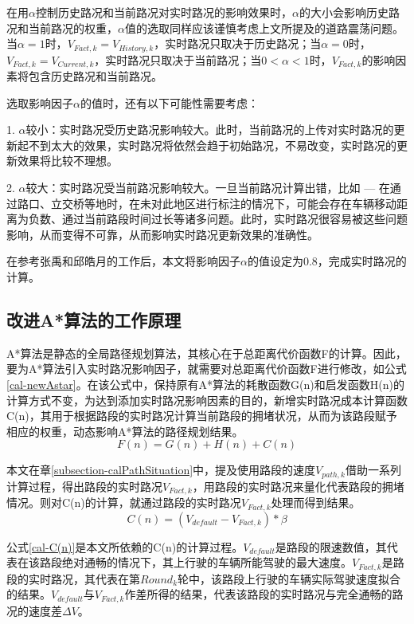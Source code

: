 在用$\alpha$控制历史路况和当前路况对实时路况的影响效果时，$\alpha$的大小会影响历史路况和当前路况的权重，$\alpha$值的选取同样应该谨慎考虑上文所提及的道路震荡问题。当$\alpha=1$时，$V_{Fact,k}=V_{History,k}$，实时路况只取决于历史路况；当$\alpha=0$时，$V_{Fact,k}=V_{Current,k}$，实时路况只取决于当前路况；当$0<\alpha<1$时，$V_{Fact,k}$的影响因素将包含历史路况和当前路况。

选取影响因子$\alpha$的值时，还有以下可能性需要考虑：

1. $\alpha$较小：实时路况受历史路况影响较大。此时，当前路况的上传对实时路况的更新起不到太大的效果，实时路况将依然会趋于初始路况，不易改变，实时路况的更新效果将比较不理想。

2. $\alpha$较大：实时路况受当前路况影响较大。一旦当前路况计算出错，比如 --- 在通过路口、立交桥等地时，在未对此地区进行标注的情况下，可能会存在车辆移动距离为负数、通过当前路段时间过长等诸多问题。此时，实时路况很容易被这些问题影响，从而变得不可靠，从而影响实时路况更新效果的准确性。

在参考张禹\cite{张禹基于车辆轨迹的动态路况挖掘}和邱皓月\cite{孙卫真2019低采样率浮动车的路况计算精度优化}的工作后，本文将影响因子$\alpha$的值设定为0.8，完成实时路况的计算。

\subsection{改进A*算法的工作原理}

A*算法是静态的全局路径规划算法，其核心在于总距离代价函数F的计算。因此，要为A*算法引入实时路况影响因子，就需要对总距离代价函数F进行修改，如公式\ref{cal-newAstar}。在该公式中，保持原有A*算法的耗散函数G(n)和启发函数H(n)的计算方式不变，为达到添加实时路况影响因素的目的，新增实时路况成本计算函数C(n)，其用于根据路段的实时路况计算当前路段的拥堵状况，从而为该路段赋予相应的权重，动态影响A*算法的路径规划结果。
\begin{equation}
    F(n)=G(n)+H(n)+C(n)
\label{cal-newAstar}
\end{equation}

本文在章\ref{subsection-calPathSituation}中，提及使用路段的速度$V_{path,k}$借助一系列计算过程，得出路段的实时路况$V_{Fact,k}$，用路段的实时路况来量化代表路段的拥堵情况。则对C(n)的计算，就通过路段的实时路况$V_{Fact,k}$处理而得到结果。
\begin{equation}
    C(n)=(V_{default}-V_{Fact,k})*\beta
\label{cal-C(n)}
\end{equation}

公式\ref{cal-C(n)}是本文所依赖的C(n)的计算过程。$V_{default}$是路段的限速数值，其代表在该路段绝对通畅的情况下，其上行驶的车辆所能驾驶的最大速度。$V_{Fact,k}$是路段的实时路况，其代表在第$Round_k$轮中，该路段上行驶的车辆实际驾驶速度拟合的结果。$V_{default}$与$V_{Fact,k}$作差所得的结果，代表该路段的实时路况与完全通畅的路况的速度差$\Delta V$。

